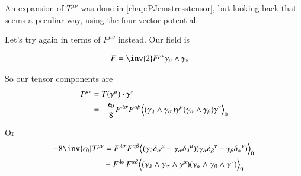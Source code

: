 An expansion of $T^{\mu\nu}$ was done in \ref{chap:PJemstresstensor}, but looking
back that seems a peculiar way, using the four vector potential.

Let's try again in terms of $F^{\mu\nu}$ instead.  Our field is

\begin{align}
F 
&= \inv{2} F^{\mu\nu} \gamma_{\mu} \wedge \gamma_\nu 
\end{align}

So our tensor components are
\begin{align*}
T^{\mu\nu}
&= T(\gamma^\mu) \cdot \gamma^\nu \\
&= -\frac{\epsilon_0}{8} F^{\lambda\sigma} F^{\alpha\beta} 
{\left\langle{{ (\gamma_\lambda \wedge \gamma_\sigma) \gamma^\mu (\gamma_\alpha \wedge \gamma_\beta) \gamma^\nu }}\right\rangle}_{0} \\
\end{align*}

Or
\begin{align*}
-8{\inv{\epsilon_0}} T^{\mu\nu}
&= 
F^{\lambda\sigma} F^{\alpha\beta} 
\gpgradezero{ 
(\gamma_\lambda {\delta_\sigma}^\mu 
-\gamma_\sigma {\delta_\lambda}^\mu)
(\gamma_\alpha {\delta_\beta}^\nu 
-\gamma_\beta {\delta_\alpha}^\nu)
} \\
&+
F^{\lambda\sigma} F^{\alpha\beta} 
\gpgradezero{ (\gamma_\lambda \wedge \gamma_\sigma \wedge \gamma^\mu) (\gamma_\alpha \wedge \gamma_\beta \wedge \gamma^\nu) } \\
\end{align*}

